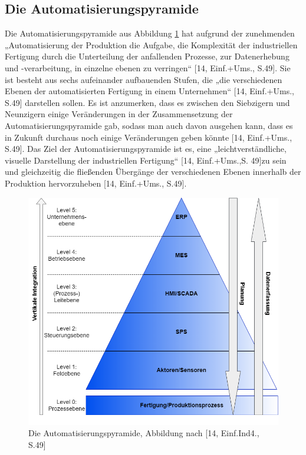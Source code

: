 \subsection{Die Automatisierungspyramide}\label{sec:Automatisierungspyramide}
Die Automatisierungspyramide aus Abbildung \ref{fig:Automatisierungspyramide} hat aufgrund der zunehmenden „Automatisierung der Produktion die Aufgabe, die Komplexität der industriellen Fertigung durch die Unterteilung der anfallenden Prozesse, zur Datenerhebung und -verarbeitung, in einzelne ebenen zu verringen“ [14, Einf.+Ums., S.49]. Sie ist besteht aus sechs aufeinander aufbauenden Stufen, die „die verschiedenen Ebenen der automatisierten Fertigung in einem Unternehmen“ [14, Einf.+Ums., S.49] darstellen sollen. Es ist anzumerken, dass es zwischen den Siebzigern und Neunzigern einige Veränderungen in der Zusammensetzung der Automatisierungspyramide gab, sodass man auch davon ausgehen kann, dass es in Zukunft durchaus noch einige Veränderungen geben könnte [14, Einf.+Ums., S.49]. Das Ziel der Automatisierungspyramide ist es, eine „leichtverständliche, visuelle Darstellung der industriellen Fertigung“ [14, Einf.+Ums.,S. 49]zu sein und gleichzeitig die fließenden Übergänge der verschiedenen Ebenen innerhalb der Produktion hervorzuheben [14, Einf.+Ums., S.49].
\begin{figure}[h]
	\centering
	\includegraphics[width=1\linewidth]{Bilder/A9_Automatisierungspyramide}
	\caption{Die Automatisierungspyramide, Abbildung nach [14, Einf.Ind4., S.49]}
	\label{fig:Automatisierungspyramide}
\end{figure}
